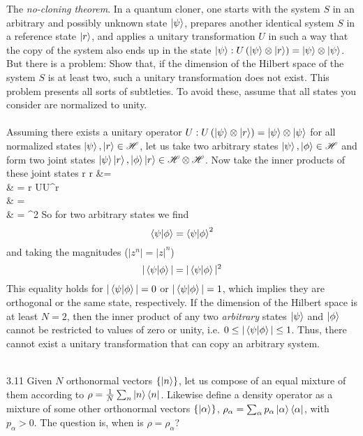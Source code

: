 \documentclass[10pt,letterpaper]{article}
\begin{document}
	The \emph{no-cloning theorem}. In a quantum cloner, one starts with the system $S$ in an arbitrary
	and possibly unknown state $\ket\psi$, prepares another identical system $S$ in a reference state
	$\ket r$, and applies a unitary transformation $U$ in such a way that the copy of the system also
	ends up in the state $\ket\psi: U\left( \ket\psi \otimes \ket r\right)  = \ket\psi \otimes \ket\psi$. But there is a problem:
	Show that, if the dimension of the Hilbert space of the system $S$ is at least two, such a unitary
	transformation does not exist. This problem presents all sorts of subtleties. To avoid these, assume that
	all states you consider are normalized to unity. 
	\\ \\
	Assuming there exists a unitary operator $U: U\left( \ket\psi \otimes \ket r\right)  = \ket\psi \otimes \ket\psi$ for all 
	normalized states $\ket \psi,\ket r \in \mathscr H$, let us take two arbitrary states $\ket \psi, \ket \phi \in \mathscr H$ and 		form two joint states $\ket \psi \ket r, \ket \phi\ket r \in \mathscr H \otimes \mathscr H$. Now take the inner products
	of these joint states
	\ba
		\bra r \bra \psi \ket \phi \ket r &= \braket{\psi|\phi} \\
		& = \bra r \bra \psi UU^\dag \ket \phi \ket r \\
		& = \bra \psi \bra \psi \ket \phi \ket \phi \\
		& = \braket{\psi|\phi}^2
	\ea
	So for two arbitrary states we find
	\[
			\braket{\psi|\phi} =  \braket{\psi|\phi}^2
	\]
	and taking the magnitudes ($|z^n| = |z|^n$)
	\[
		|\braket{\psi|\phi}| = |\braket{\psi|\phi}|^2
	\]
	This equality holds for $|\braket{\psi|\phi}| = 0$ or $|\braket{\psi|\phi}| = 1$, which implies they are orthogonal 
	or the same state, respectively. If the dimension of the Hilbert space is at least $N=2$, then the inner
	product of any two \emph{arbitrary} states $\ket \psi$ and $\ket \phi$ cannot be restricted to values of 
	zero or unity, i.e. $0\le |\braket{\psi|\phi}| \le 1$. Thus, there cannot exist a unitary transformation that can
	copy an arbitrary system. 
	\\ \\
	\item[3.11]
	Given $N$ orthonormal vectors $\{ \ket n \}$, let us compose of an equal mixture of them according to 
	$\rho = \frac{1}{N} \sum_n \ket n\bra n$. Likewise define a density operator as a mixture of some other orthonormal
	vectors $\{ \ket\alpha \}$, $\rho_\alpha = \sum_\alpha p_\alpha \ket\alpha \bra\alpha$, with
	$p_\alpha >0$. The question is, when is $\rho = \rho_\alpha$?
		
\end{document}
